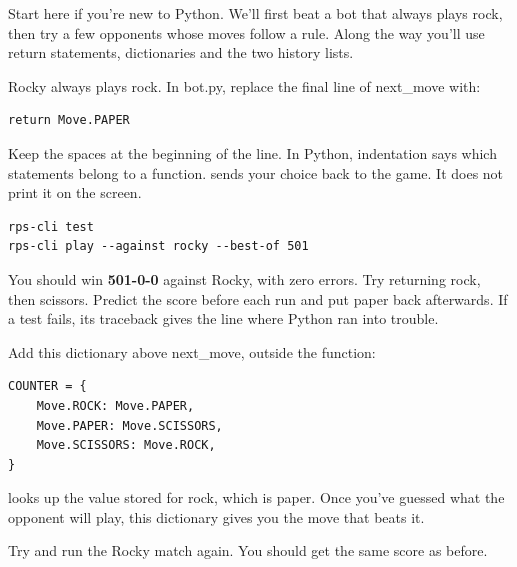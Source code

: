 \documentclass[11pt]{article}
\begin{document}
\thispagestyle{plain}


\clearpage

\clearpage
{}

\begin{context}
Start here if you're new to Python. We'll first beat a bot that always plays rock, then try a few opponents whose moves follow a rule. Along the way you'll use return statements, dictionaries and the two history lists.

\end{context}


Rocky always plays rock. In bot.py, replace the final line of next\_move with:


\begin{lstlisting}[style=python,numbers=none,xleftmargin=4pt,framexleftmargin=0pt]
    return Move.PAPER
\end{lstlisting}

Keep the spaces at the beginning of the line. In Python, indentation says which statements belong to a function.  sends your choice back to the game. It does not print it on the screen.


\begin{lstlisting}[style=shell,numbers=none,xleftmargin=4pt,framexleftmargin=0pt]
rps-cli test
rps-cli play --against rocky --best-of 501
\end{lstlisting}

You should win \textbf{501-0-0} against Rocky, with zero errors. Try returning rock, then scissors. Predict the score before each run and put paper back afterwards. If a test fails, its traceback gives the line where Python ran into trouble.



Add this dictionary above next\_move, outside the function:


\begin{lstlisting}[style=python]
COUNTER = {
    Move.ROCK: Move.PAPER,
    Move.PAPER: Move.SCISSORS,
    Move.SCISSORS: Move.ROCK,
}
\end{lstlisting}

 looks up the value stored for rock, which is paper. Once you've guessed what the opponent will play, this dictionary gives you the move that beats it.


Try  and run the Rocky match again. You should get the same score as before.
\end{document}
